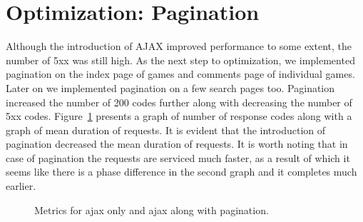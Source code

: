 \section{Optimization: Pagination}
Although the introduction of AJAX improved performance to some extent, the number of 5xx was still high. As the next step to optimization, we implemented pagination on the index page of games and comments page of individual games. Later on we implemented pagination on a few search pages too. Pagination increased the number of 200 codes further along with decreasing the number of 5xx codes. Figure~\ref{fig:aap} presents a graph of number of response codes along with a graph of mean duration of requests. It is evident that the introduction of pagination decreased the mean duration of requests. It is worth noting that in case of pagination the requests are serviced much faster, as a result of which it seems like there is a phase difference in the second graph and it completes much earlier.

\begin{figure}%
    \centering
    \qquad
    \caption{Metrics for ajax only and ajax along with pagination.}%
    \label{fig:aap}%
\end{figure}

